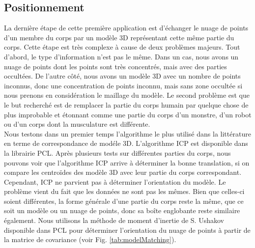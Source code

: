 \subsection{Positionnement}
La dernière étape de cette première application est d'échanger le nuage de points d'un membre du corps par un modèle 3D représentant cette même partie
du corps. Cette étape est très complexe à cause de deux problèmes majeurs. Tout d'abord, le type d'information n'est pas le même. Dans un cas, nous avons
un nuage de points dont les points sont très concentrés, mais avec des parties occultées. De l'autre côté, nous avons un modèle 3D avec un nombre de points
inconnus, donc une concentration de points inconnu, mais sans zone occultée si nous prenons en considération le maillage du modèle. Le second problème
est que le but recherché est de remplacer la partie du corps humain par quelque chose de plus improbable et étonnant comme une partie du corps d'un monstre,
d'un robot ou d'un corps dont la musculature est différente.\\

Nous testons dans un premier temps l'algorithme le plus utilisé dans la littérature en terme de correspondance de modéle 3D. L'algorithme ICP\cite{ICP} est
disponible dans la librairie PCL\cite{PCL}. Après plusieurs tests sur différentes parties du corps, nous pouvons voir que l'algorithme ICP arrive à déterminer
la bonne translation, si on compare les centroïdes des modèle 3D avec leur partie du corps correspondant. Cependant, ICP ne parvient pas à déterminer
l'orientation du modèle. Le problème vient du fait que les données ne sont pas les mêmes. Bien que celles-ci soient différentes, la forme générale
d'une partie du corps reste la même, que ce soit un modèle ou un nuage de points, donc sa boîte englobante reste similaire également. Nous utilisons la méthode
de moment d'inertie de S. Ushakov disponible dans PCL pour déterminer l'orientation du nuage de points à partir de la matrice de covariance
(voir Fig. \ref{tab:modelMatching}).\\

